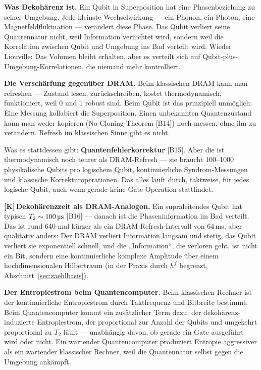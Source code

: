 \documentclass[11pt,a4paper]{article}
\newcommand{\LK}{\textcolor{layK}{\textbf{\footnotesize\textsf{[K]}}}\,}
\begin{document}
\textbf{Was Dekohärenz ist.} Ein Qubit in Superposition hat eine Phasenbeziehung
zu seiner Umgebung. Jede kleinste Wechselwirkung --- ein Phonon, ein Photon, eine
Magnetfeldfluktuation --- verändert diese Phase. Das Qubit verliert seine
Quantennatur nicht, weil Information vernichtet wird, sondern weil die Korrelation
zwischen Qubit und Umgebung ins Bad verteilt wird. Wieder Liouville: Das Volumen
bleibt erhalten, aber es verteilt sich auf Qubit-plus-Umgebung-Korrelationen, die
niemand mehr kontrolliert.

\textbf{Die Verschärfung gegenüber DRAM.} Beim klassischen DRAM kann man
refreshen --- Zustand lesen, zurückschreiben, kostet thermodynamisch,
funktioniert, weil 0 und 1 robust sind. Beim Qubit ist das prinzipiell unmöglich:
Eine Messung kollabiert die Superposition. Einen unbekannten Quantenzustand kann
man weder kopieren (No-Cloning-Theorem [B14]) noch messen, ohne ihn zu verändern.
Refresh im klassischen Sinne gibt es nicht.

Was es stattdessen gibt: \textbf{Quantenfehlerkorrektur} [B15]. Aber die ist
thermodynamisch noch teurer als DRAM-Refresh --- sie braucht 100--1000
physikalische Qubits pro logischem Qubit, kontinuierliche Syndrom-Messungen und
klassische Korrekturoperationen. Das alles läuft durch, taktweise, für jedes
logische Qubit, auch wenn gerade keine Gate-Operation stattfindet.

\LK \textbf{Dekohärenzzeit als DRAM-Analogon.} Ein supraleitendes Qubit hat
typisch $T_2 \sim 100\,\text{\textmu s}$ [B16] --- danach ist die
Phaseninformation im Bad verteilt. Das ist rund 640-mal kürzer als ein
DRAM-Refresh-Intervall von 64\,ms, aber qualitativ anders: Der DRAM verliert
Information langsam und stetig, das Qubit verliert sie exponentiell schnell, und
die „Information“, die verloren geht, ist nicht ein Bit, sondern eine
kontinuierliche komplexe Amplitude über einem hochdimensionalen Hilbertraum (in
der Praxis durch $h^f$ begrenzt, Abschnitt~\ref{sec:zaehlbasis}).

\textbf{Der Entropiestrom beim Quantencomputer.} Beim klassischen Rechner ist der
kontinuierliche Entropiestrom durch Taktfrequenz und Bitbreite bestimmt. Beim
Quantencomputer kommt ein zusätzlicher Term dazu: der dekohärenz-induzierte
Entropiestrom, der proportional zur Anzahl der Qubits und umgekehrt proportional
zu $T_2$ läuft --- unabhängig davon, ob gerade ein Gate ausgeführt wird oder
nicht. Ein wartender Quantencomputer produziert Entropie aggressiver als ein
wartender klassischer Rechner, weil die Quantennatur selbst gegen die Umgebung
ankämpft.
\end{document}
